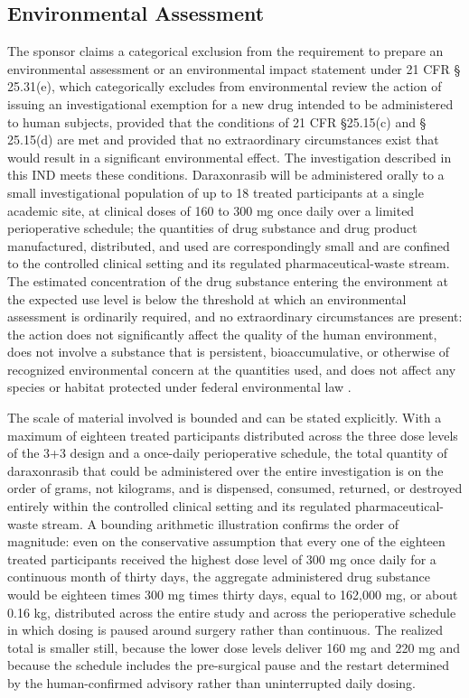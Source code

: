 \subsection{Environmental Assessment}

The sponsor claims a categorical exclusion from the requirement to prepare an
environmental assessment or an environmental impact statement under 21 CFR \S
25.31(e), which categorically excludes from environmental review the action of
issuing an investigational exemption for a new drug intended to be administered to
human subjects, provided that the conditions of 21 CFR \S 25.15(c) and \S
25.15(d) are met and provided that no extraordinary circumstances exist that would
result in a significant environmental effect. The investigation described in this
IND meets these conditions. Daraxonrasib will be administered orally to a small
investigational population of up to 18 treated participants at a single academic
site, at clinical doses of 160 to 300 mg once daily over a limited perioperative
schedule; the quantities of drug substance and drug product manufactured,
distributed, and used are correspondingly small and are confined to the
controlled clinical setting and its regulated pharmaceutical-waste stream. The
estimated concentration of the drug substance entering the environment at the
expected use level is below the threshold at which an environmental assessment is
ordinarily required, and no extraordinary circumstances are present: the action
does not significantly affect the quality of the human environment, does not
involve a substance that is persistent, bioaccumulative, or otherwise of
recognized environmental concern at the quantities used, and does not affect any
species or habitat protected under federal environmental law
\cite{phase1guidance}.

The scale of material involved is bounded and can be stated explicitly. With a
maximum of eighteen treated participants distributed across the three dose levels
of the 3+3 design and a once-daily perioperative schedule, the total quantity of
daraxonrasib that could be administered over the entire investigation is on the
order of grams, not kilograms, and is dispensed, consumed, returned, or destroyed
entirely within the controlled clinical setting and its regulated
pharmaceutical-waste stream. A bounding arithmetic illustration confirms the
order of magnitude: even on the conservative assumption that every one of the
eighteen treated participants received the highest dose level of 300 mg once daily
for a continuous month of thirty days, the aggregate administered drug substance
would be eighteen times 300 mg times thirty days, equal to 162,000 mg, or about
0.16 kg, distributed across the entire study and across the perioperative schedule
in which dosing is paused around surgery rather than continuous. The realized
total is smaller still, because the lower dose levels deliver 160 mg and 220 mg
and because the schedule includes the pre-surgical pause and the restart
determined by the human-confirmed advisory rather than uninterrupted daily dosing.

